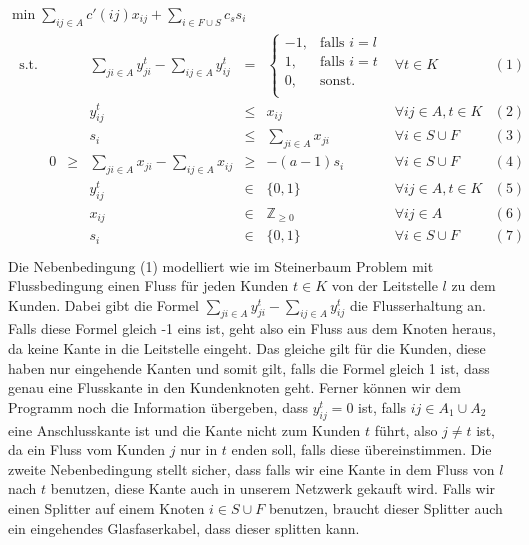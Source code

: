 \documentclass[11pt,a4paper]{article}
\newcommand{\Z}{\mathbb{Z}}
\theoremstyle{my_th_style1}
\begin{document}
 \bigskip
 $\min \displaystyle\sum_{ij \in A} c'(ij) x_{ij} + \displaystyle\sum_{i \in F \cup S} c_s s_i $
 \begin{align}\label{model_p2mpf}
 \begin{array}{rcrcrcll}
 \textrm{s.t.}  
&& &\displaystyle\sum_{ji \in A} y_{ji}^t - \displaystyle\sum_{ij \in A} y_{ij}^t& = & \left\{\begin{array}{cl} 
 -1, & \text{falls } i=l\\ 
 1, & \text{falls } i=t\\ 
 0, & \text{sonst.}\\ 
 \end{array}
 \right. & \forall t \in K & (1) \\
 &&& y_{ij}^t & \leq & x_{ij} & \forall ij \in A, t\in K & (2)\\
 &&& s_i &\leq& \displaystyle\sum_{ji \in A} x_{ji}& \forall  i \in S \cup F& (3)\\ 
 &0&\geq&\displaystyle\sum_{ji \in A} x_{ji} - \displaystyle\sum_{ij \in A} x_{ij}&\geq& -(a-1)s_i & \forall i \in S \cup F& (4)\\
 &&& y_{ij}^t & \in & \{0,1 \}& \forall ij \in A, t \in K & (5)\\
 &&& x_{ij} & \in & \Z _{\geq 0}& \forall ij \in A & (6)\\
 &&& s_i & \in & \{ 0,1 \} & \forall i \in S \cup F & (7) \\
 \end{array}
 \end{align}
Die Nebenbedingung (1) modelliert wie im Steinerbaum Problem mit Flussbedingung einen Fluss für jeden Kunden $t \in K$ von der Leitstelle $l$ zu dem Kunden.
Dabei gibt die Formel $\displaystyle\sum_{ji \in A} y_{ji}^t - \displaystyle\sum_{ij \in A} y_{ij}^t$ die Flusserhaltung an.
Falls diese Formel gleich -1 eins ist, geht also ein Fluss aus dem Knoten heraus, da keine Kante in die Leitstelle eingeht.
Das gleiche gilt für die Kunden, diese haben nur eingehende Kanten und somit gilt, falls die Formel gleich 1 ist, dass genau eine Flusskante in den Kundenknoten geht.
Ferner k\"onnen wir dem Programm noch die Information \"ubergeben, dass \(y_{ij}^t = 0\) ist, falls \(ij \in A_1 \cup A_2\) eine Anschlusskante ist und die Kante nicht zum Kunden \(t\) f\"uhrt, also \(j \neq t\) ist, da ein Fluss vom Kunden \(j\) nur in \(t\) enden soll, falls diese \"ubereinstimmen.
Die zweite Nebenbedingung stellt sicher, dass falls wir eine Kante in dem Fluss von $l$ nach $t$ benutzen, diese Kante auch in unserem Netzwerk gekauft wird.
Falls wir einen Splitter auf einem Knoten $i \in S \cup F$ benutzen, braucht dieser Splitter auch ein eingehendes Glasfaserkabel, dass dieser splitten kann.
\end{document}
